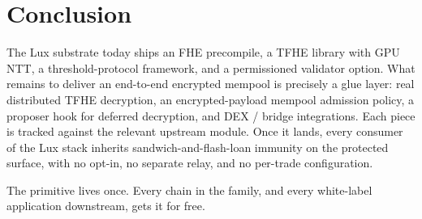 \documentclass[11pt,a4paper]{article}
\begin{document}
\section{Conclusion}

The Lux substrate today ships an FHE precompile, a TFHE library
with GPU NTT, a threshold-protocol framework, and a permissioned
validator option. What remains to deliver an end-to-end encrypted
mempool is precisely a glue layer: real distributed TFHE
decryption, an encrypted-payload mempool admission policy, a
proposer hook for deferred decryption, and DEX / bridge
integrations. Each piece is tracked against the relevant upstream
module. Once it lands, every consumer of the Lux stack inherits
sandwich-and-flash-loan immunity on the protected surface, with no
opt-in, no separate relay, and no per-trade configuration.

The primitive lives once. Every chain in the family, and every
white-label application downstream, gets it for free.
\end{document}

